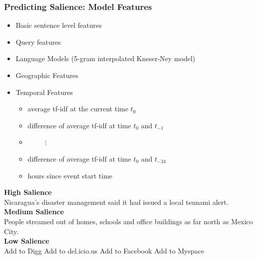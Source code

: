 \documentclass{beamer}
\begin{document}
\begin{frame}
\frametitle{Predicting Salience: Model Features}
\begin{itemize}
\item Basic sentence level features
\item Query features
\item Language Models (5-gram interpolated Kneser-Ney model)
\item Geographic Features
\item Temporal Features
\begin{itemize}
\item average tf-idf at the current time $t_0$
\item difference of average tf-idf at time $t_0$ and $t_{-1}$
\item $\;\;\;\;\;\;\;\;\;\vdots$
\item difference of average tf-idf at time $t_0$ and $t_{-24}$
\item hours since event start time
\end{itemize}
\end{itemize}


\pause
\textbf{High Salience}\\ 
\alert<2>{Nicaragua's disaster management} said it had issued a local \alert<2>{tsunami} alert.\\
\textbf{Medium Salience} \\
People streamed out of homes, schools and office buildings as far north as Mexico City.\\
\textbf{Low Salience} \\
\alert<3>{Add to Digg Add to del.icio.us Add to Facebook Add to Myspace} 

\end{frame}
\end{document}
